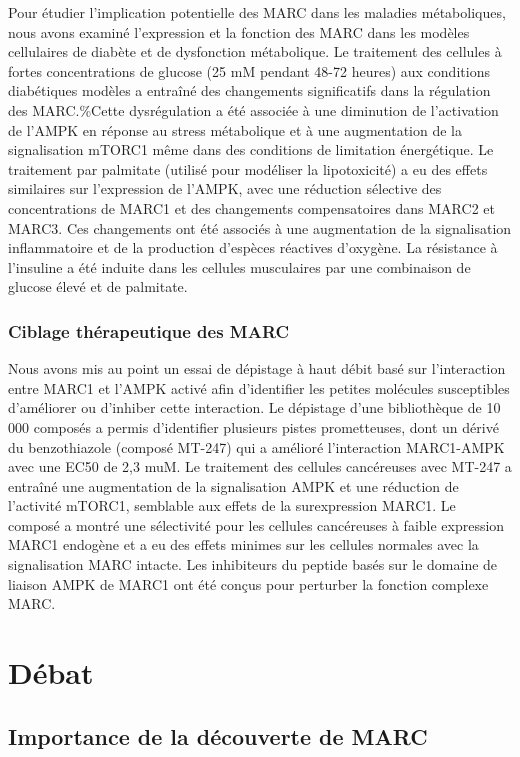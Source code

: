 \documentclass[11pt,a4paper]{article}
\begin{document}
Pour étudier l'implication potentielle des MARC dans les maladies métaboliques, nous avons examiné l'expression et la fonction des MARC dans les modèles cellulaires de diabète et de dysfonction métabolique. Le traitement des cellules à fortes concentrations de glucose (25 mM pendant 48-72 heures) aux conditions diabétiques modèles a entraîné des changements significatifs dans la régulation des MARC.\%Cette dysrégulation a été associée à une diminution de l'activation de l'AMPK en réponse au stress métabolique et à une augmentation de la signalisation mTORC1 même dans des conditions de limitation énergétique. Le traitement par palmitate (utilisé pour modéliser la lipotoxicité) a eu des effets similaires sur l'expression de l'AMPK, avec une réduction sélective des concentrations de MARC1 et des changements compensatoires dans MARC2 et MARC3. Ces changements ont été associés à une augmentation de la signalisation inflammatoire et de la production d'espèces réactives d'oxygène. La résistance à l'insuline a été induite dans les cellules musculaires par une combinaison de glucose élevé et de palmitate.

\subsubsection{Ciblage thérapeutique des MARC}

Nous avons mis au point un essai de dépistage à haut débit basé sur l'interaction entre MARC1 et l'AMPK activé afin d'identifier les petites molécules susceptibles d'améliorer ou d'inhiber cette interaction. Le dépistage d'une bibliothèque de 10 000 composés a permis d'identifier plusieurs pistes prometteuses, dont un dérivé du benzothiazole (composé MT-247) qui a amélioré l'interaction MARC1-AMPK avec une EC50 de 2,3 muM. Le traitement des cellules cancéreuses avec MT-247 a entraîné une augmentation de la signalisation AMPK et une réduction de l'activité mTORC1, semblable aux effets de la surexpression MARC1. Le composé a montré une sélectivité pour les cellules cancéreuses à faible expression MARC1 endogène et a eu des effets minimes sur les cellules normales avec la signalisation MARC intacte. Les inhibiteurs du peptide basés sur le domaine de liaison AMPK de MARC1 ont été conçus pour perturber la fonction complexe MARC.

\section{Débat}

\subsection{Importance de la découverte de MARC}
\end{document}
